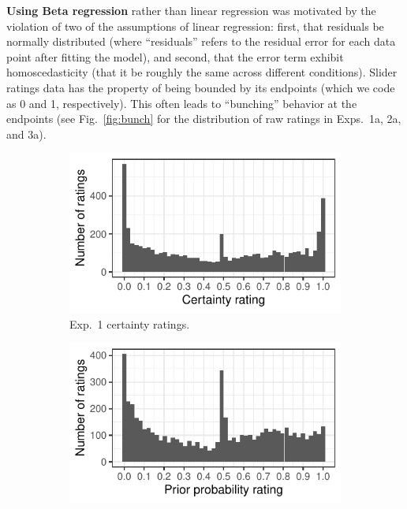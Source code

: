 \documentclass[11pt,fleqn]{article}
\newcommand{\figref}[1]{Fig.~\ref{#1}}
\newcommand{\6}{\mbox{$[\hspace*{-.6mm}[$}}
\newcommand{\9}{\mbox{$]\hspace*{-.6mm}]$}}
\begin{document}
\textbf{Using Beta regression} rather than linear regression was motivated by the violation of two of the  assumptions of linear regression: first, that residuals be normally distributed (where ``residuals'' refers to the residual error for each data point after fitting the model), and second, that the error term exhibit homoscedasticity (that it be roughly the same across different conditions). Slider ratings data has the property of being bounded by its endpoints (which we code as 0 and 1, respectively). This often leads to ``bunching'' behavior at the endpoints (see  \figref{fig:bunch} for the distribution of raw ratings in Exps.~1a, 2a, and 3a). 


\begin{figure}[h!]
\begin{subfigure}{.33\textwidth}
\includegraphics[width=\textwidth]{../../results/9-prior-projection/graphs/bunching-projection}
\caption{Exp.~1 certainty ratings.}
\label{fig:exp1araw}
\end{subfigure}
\begin{subfigure}{.33\textwidth}
\includegraphics[width=\textwidth]{../../results/9-prior-projection/graphs/bunching-prior}

\end{subfigure}
\end{figure}
\end{document}
